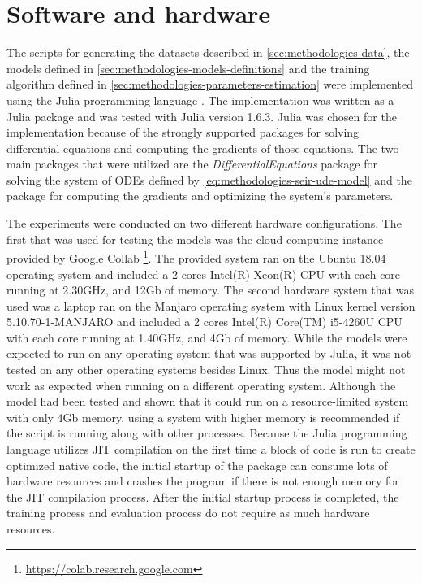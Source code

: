 \section{Software and hardware}

The scripts for generating the datasets described in \autoref{sec:methodologies-data}, the models defined in \autoref{sec:methodologies-models-definitions} and the training algorithm defined in \autoref{sec:methodologies-parameters-estimation} were implemented using the Julia programming language \cite{bezanson2012julia}.
The implementation was written as a Julia package and was tested with Julia version 1.6.3.
Julia was chosen for the implementation because of the strongly supported packages for solving differential equations and computing the gradients of those equations.
The two main packages that were utilized are the \textit{DifferentialEquations} package \cite{rackauckas2017differentialequations} for solving the system of \glspl{ODE} defined by \autoref{eq:methodologies-seir-ude-model} and the  \cite{rackauckasUniversalDifferentialEquations2020} package for computing the gradients and optimizing the system's parameters.

The experiments were conducted on two different hardware configurations.
The first that was used for testing the models was the cloud computing instance provided by Google Collab \footnote{\url{https://colab.research.google.com}}.
The provided system ran on the Ubuntu 18.04 operating system and included a 2 cores Intel(R) Xeon(R) CPU with each core running at 2.30GHz, and 12Gb of memory.
The second hardware system that was used was a laptop ran on the Manjaro operating system with Linux kernel version 5.10.70-1-MANJARO and included a 2 cores Intel(R) Core(TM) i5-4260U CPU with each core running at 1.40GHz, and 4Gb of memory.
While the models were expected to run on any operating system that was supported by Julia, it was not tested on any other operating systems besides Linux.
Thus the model might not work as expected when running on a different operating system.
Although the model had been tested and shown that it could run on a resource-limited system with only 4Gb memory, using a system with higher memory is recommended if the script is running along with other processes.
Because the Julia programming language utilizes \gls{JIT} compilation on the first time a block of code is run to create optimized native code, the initial startup of the package can consume lots of hardware resources and crashes the program if there is not enough memory for the \gls{JIT} compilation process.
After the initial startup process is completed, the training process and evaluation process do not require as much hardware resources.